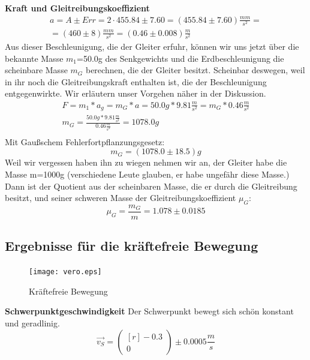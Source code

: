 \documentclass{article}
\begin{document}
\textbf{Kraft und Gleitreibungskoeffizient}
\begin{gather*}
a=A\pm Err=2\cdot 455.84 \pm 7.60=(455.84\pm 7.60)\frac{mm}{s^2}= \\
=(460\pm8)\frac{mm}{s^2}=(0.46\pm0.008)\frac{m}{s^2}
\end{gather*}
Aus dieser Beschleunigung, die der Gleiter erfuhr, können wir uns jetzt über die bekannte Masse $m_1$=50.0g des Senkgewichts und die Erdbeschleunigung die scheinbare Masse $m_G$ berechnen, die der Gleiter besitzt. Scheinbar deswegen, weil in ihr noch die Gleitreibungskraft enthalten ist, die der Beschleunigung entgegenwirkte. Wir erläutern unser Vorgehen näher in der Diskussion.
\begin{gather}
F=m_1*a_g=m_G*a=50.0g*9.81\frac{m}{s^2}=m_G*0.46\frac{m}{s^2} \\
m_G=\frac{50.0g*9.81\frac{m}{s^2}}{0.46\frac{m}{s^2}}=1078.0g \\
\end{gather}
Mit Gaußschem Fehlerfortpflanzungsgesetz:
\begin{equation}
m_G=(1078.0 \pm18.5)g
\end{equation}
Weil wir vergessen haben ihn zu wiegen nehmen wir an, der Gleiter habe die Masse m=1000g (verschiedene Leute glauben, er habe ungefähr diese Masse.) Dann ist der Quotient aus der scheinbaren Masse, die er durch die Gleitreibung besitzt, und seiner schweren Masse der Gleitreibungskoeffizient $\mu_G$:
\begin{equation}
\mu_G=\frac{m_G}{m}=1.078\pm0.0185
\end{equation}


\subsection{Ergebnisse für die kräftefreie Bewegung}
\begin{figure}[H]
\caption{Kräftefreie Bewegung}
\begin{center}
\texttt{[image: vero.eps]}
\end{center}
\end{figure}
\textbf{Schwerpunktgeschwindigkeit}
Der Schwerpunkt bewegt sich schön konstant und geradlinig.
\begin{equation}
\vec{v_S}=
\begin{pmatrix*}[r]
-0.3 \\ 0
\end{pmatrix*}\pm 0.0005 \frac{m}{s}
\end{equation}
\end{document}
